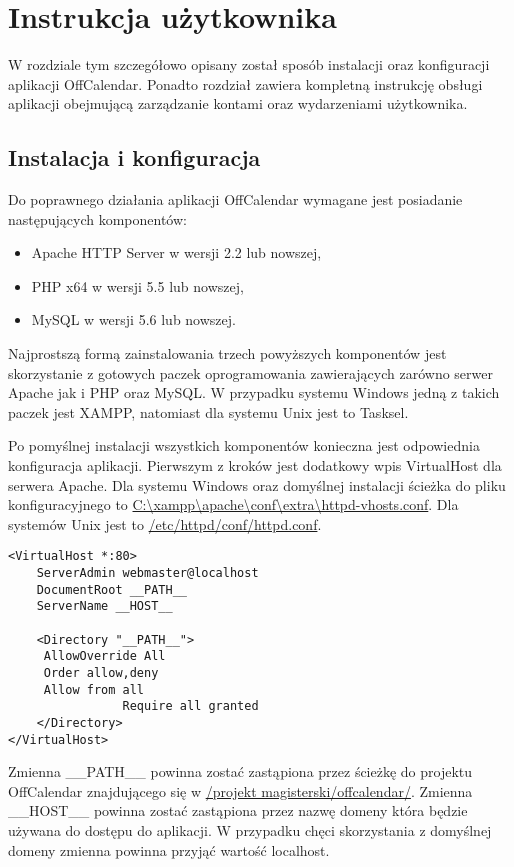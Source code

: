 \chapter{Instrukcja użytkownika}
\label{cha:instrUzytk}

W rozdziale tym szczegółowo opisany został sposób instalacji oraz konfiguracji aplikacji OffCalendar. Ponadto rozdział zawiera kompletną instrukcję obsługi aplikacji obejmującą zarządzanie kontami oraz wydarzeniami użytkownika.

\section{Instalacja i konfiguracja}
\label{sec:instKonf}

Do poprawnego działania aplikacji OffCalendar wymagane jest posiadanie następujących komponentów:

\begin{itemize}
\item Apache HTTP Server w wersji 2.2 lub nowszej,
\item PHP x64 w wersji 5.5 lub nowszej,
\item MySQL w wersji 5.6 lub nowszej.
\end{itemize}

Najprostszą formą zainstalowania trzech powyższych komponentów jest skorzystanie z gotowych paczek oprogramowania zawierających zarówno serwer Apache jak i PHP oraz MySQL. W przypadku systemu Windows jedną z takich paczek jest XAMPP, natomiast dla systemu Unix jest to Tasksel.

Po pomyślnej instalacji wszystkich komponentów konieczna jest odpowiednia konfiguracja aplikacji. Pierwszym z kroków jest dodatkowy wpis VirtualHost dla serwera Apache. Dla systemu Windows oraz domyślnej instalacji ścieżka do pliku konfiguracyjnego to \url{C:\xampp\apache\conf\extra\httpd-vhosts.conf}. Dla systemów Unix jest to \url{/etc/httpd/conf/httpd.conf}.

\begin{lstlisting}[style=html5, caption=Konfiguracja serwera Apache., label=amb, captionpos=b]
<VirtualHost *:80>
    ServerAdmin webmaster@localhost
    DocumentRoot __PATH__
    ServerName __HOST__

    <Directory "__PATH__">
   	 AllowOverride All
   	 Order allow,deny
   	 Allow from all
            	Require all granted
    </Directory>
</VirtualHost>
\end{lstlisting}

Zmienna \_\_PATH\_\_ powinna zostać zastąpiona przez ścieżkę do projektu OffCalendar znajdującego się w \url{/projekt magisterski/offcalendar/}. Zmienna \_\_HOST\_\_ powinna zostać zastąpiona przez nazwę domeny która będzie używana do dostępu do aplikacji. W przypadku chęci skorzystania z domyślnej domeny zmienna powinna przyjąć wartość localhost.

